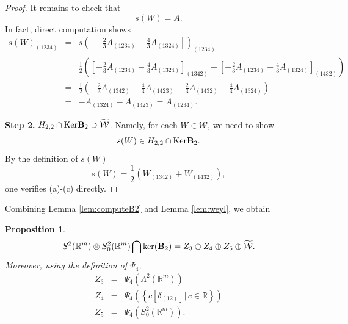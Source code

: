 \documentclass{amsart}
\newtheorem{prop}[thm]{Proposition}
\newtheorem{rem}[thm]{Remark}
\newcommand{\set}[1]{\left\{#1\right\}}
\newcommand{\Real}{\mathbb R}
\numberwithin{equation}{section}
\begin{document}
\begin{proof}
	It remains to check that
	\[
		s(W)=A.
	\]
	In fact, direct computation shows
	\begin{eqnarray*}
		s(W)_{(1234)}&=& s([-\frac{2}{3}A_{(1234)}-\frac{4}{3}A_{(1324)}])_{(1234)} \\
			     &=&\frac{1}{2}\left( [-\frac{2}{3}A_{(1234)}-\frac{4}{3}A_{(1324)}]_{(1342)}+ [-\frac{2}{3}A_{(1234)}-\frac{4}{3}A_{(1324)}]_{(1432)} \right) \\
			     &=&\frac{1}{2} \left( -\frac{2}{3}A_{(1342)}-\frac{4}{3}A_{(1423)} -\frac{2}{3}A_{(1432)}-\frac{4}{3}A_{(1324)} \right)\\
			     &=& -A_{(1324)}-A_{(1423)}=A_{(1234)}.
	\end{eqnarray*}

	{\bf Step 2.} $H_{2,2}\cap {\rm Ker}{\mathbf B}_2\supset \widetilde{\mathcal W}$. Namely, for each $W\in \mathcal W$, we need to show
	$$
	s(W) \in H_{2,2}\cap{\rm Ker}{\mathbf B}_2. 
	$$
	By the definition of $s(W)$ 
	\[
		s(W)=\frac{1}{2} ( W_{(1342)}+W_{(1432)}),
	\]
	one verifies (a)-(c) directly.
\end{proof}

Combining Lemma \ref{lem:computeB2} and Lemma \ref{lem:weyl}, we obtain
\begin{prop}
	\label{prop:decomp2}
	\[
		S^2(\Real^m)\otimes S^2_0(\Real^m) \bigcap {\rm ker}({\mathbf B}_2) = Z_3\oplus Z_4\oplus Z_5\oplus \widetilde{\mathcal W}.
	\]
	Moreover, using the definition of $\Psi_4$, 
	\begin{eqnarray*}
		Z_3 &=& \Psi_4(\Lambda^2(\Real^m)) \\
		Z_4 &=& \Psi_4( \set{c [\delta_{(12)}]| \, c\in \mathbb R})\\
		Z_5 &=&\Psi_4(S_0^2(\Real^m)).
	\end{eqnarray*}
\end{prop}
\end{document}
